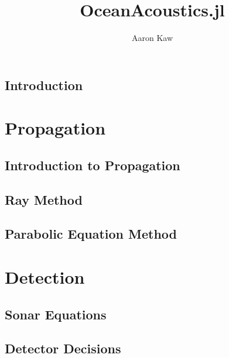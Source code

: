 \documentclass{book}
\title{OceanAcoustics.jl}
\author{Aaron Kaw}
\begin{document}
\maketitle
\tableofcontents

\chapter{Introduction}

\part{Propagation}
\chapter{Introduction to Propagation}
\chapter{Ray Method}
\chapter{Parabolic Equation Method}

\part{Detection}
\chapter{Sonar Equations}
\chapter{Detector Decisions}
\end{document}
